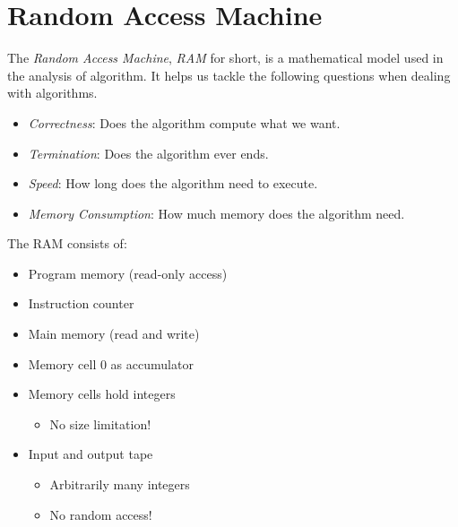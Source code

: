 \newpage
\section{Random Access Machine}

The \emph{Random Access Machine}, \emph{RAM} for short, is a mathematical model used in the analysis of algorithm. 
It helps us tackle the following questions when dealing with algorithms.

\begin{itemize}
   
    \item \emph{Correctness}: Does the algorithm compute what we want. 

    \item \emph{Termination}: Does the algorithm ever ends. 

    \item \emph{Speed}: How long does the algorithm need to execute.

    \item \emph{Memory Consumption}: How much memory does the algorithm need. 

\end{itemize}

The RAM consists of:

\begin{itemize}

    \item Program memory (read-only access)
    
    \item Instruction counter
    
    \item Main memory (read and write)
    
    \item Memory cell 0 as accumulator
    
    \item Memory cells hold integers
    
        \begin{itemize}
        
            \item No size limitation!
        
        \end{itemize}
        
    \item Input and output tape
    
        \begin{itemize}
        
            \item Arbitrarily many integers
            
            \item No random access!
        \end{itemize}

\end{itemize}


